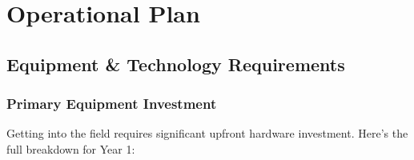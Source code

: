 
\chapter{Operational Plan}

\section{Equipment \& Technology Requirements}

\subsection{Primary Equipment Investment}

Getting into the field requires significant upfront hardware investment. Here's the full breakdown for Year 1:

